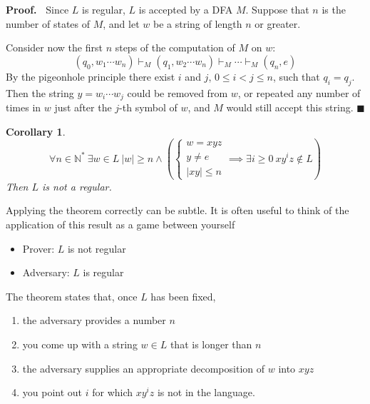 \documentclass[aps,pra,onecolumn,notitlepage,superscriptaddress]{revtex4-1}
\newcommand{\N}{\mathbb{N}}
\def\y{\vdash}
\newtheorem{cor}{Corollary}
\def\Proof{{\bf Proof.~}}
\def\qed{$\blacksquare$ \newline}
\begin{document}
    \Proof
    Since $L$ is regular, $L$ is accepted by a DFA $M$. Suppose that $n$ is the number of states of $M$, and let $w$ be a string of length $n$ or greater. 
    
    Consider now the first $n$ steps of the computation of $M$ on $w$:
    \begin{equation*}
        (q_0, w_1 \cdots w_n) \y_M (q_1, w_2 \cdots w_n) \y_M \cdots \y_M (q_n, e)
    \end{equation*}
    By the pigeonhole principle there exist $i$ and $j$, $0 \leq i < j \leq n$, such that $q_i = q_j$. Then the string $y = w_i \cdots w_j$ could be removed from $w$, or repeated any number of times in $w$ just after the $j$-th symbol of $w$, and $M$ would still accept this string. \qed


    \begin{cor}
        \begin{equation}
            \forall n \in \N^* \ \exists w \in L\ |w| \geq n \land \left(
            \begin{cases}
                w = xyz \\ y \neq e \\ |xy| \leq n
            \end{cases}    
            \implies \exists i \geq 0 \ xy^iz \notin L
            \right)
        \end{equation}
        Then $L$ is not a regular.
    \end{cor}

    Applying the theorem correctly can be subtle. It is often useful to think of the application of this result as a game between yourself
    \begin{itemize}
        \item Prover: $L$ is not regular
        \item Adversary: $L$ is regular
    \end{itemize}  
    The theorem states that, once $L$ has been fixed, 
    \begin{enumerate}
        \item the adversary provides a number $n$
        \item you come up with a string $w \in L$ that is longer than $n$
        \item the adversary supplies an appropriate decomposition of $w$ into $xyz$
        \item you point out $i$ for which $xy^iz$ is not in the language.
    \end{enumerate}
\end{document}
